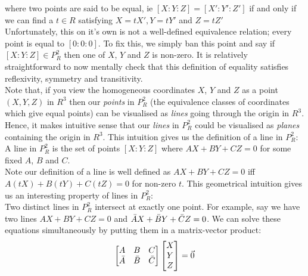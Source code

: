 \documentclass{article}
\begin{document}
where two points are said to be equal, ie $[X : Y : Z] = [X' : Y' : Z']$ if and only if we can find a $t \in R$ satisfying $X = tX', Y =  tY'$ and $Z = tZ'$\\

Unfortunately, this on it's own is not a well-defined equivalence relation; every point is equal to $[0 : 0 : 0]$. To fix this, we simply ban this point and say if  $[X : Y : Z] \in P_R^2$  then one of $X$, $Y$ and $Z$ is non-zero. It is relatively straightforward to now mentally check that this definition of equality satisfies reflexivity, symmetry and transitivity.\\

Note that, if you view the homogeneous coordinates $X$, $Y$ and $Z$ as a point $(X, Y, Z)$ in $R^3$ then our \emph{points} in $P_R^2$ (the equivalence classes of coordinates which give equal points) can be visualised as \emph{lines} going through the origin in $R^3$. Hence, it makes intuitive sense that our \emph{lines} in $P_R^2$ could be visualised as \emph{planes} containing the origin in $R^3$. This intuition gives us the definition of a line in $P_R^2$:\\

A line in $P_R^2$ is the set of points $[X : Y : Z]$ where $AX + BY + CZ = 0$ for some fixed $A$, $B$ and $C$. \\

Note our definition of a line is well defined as  $AX + BY + CZ = 0$ iff  $A(tX) + B(tY) + C(tZ) = 0$ for non-zero $t$. This geometrical intuition gives us an interesting property of lines in $P_R^2$: \\

Two distinct lines in $P_R^2$ intersect at exactly one point. For example, say we have two lines $AX + BY + CZ = 0$ and $\Bar{A}X + \bar{B}Y + \bar{C}Z = 0$. We can solve these equations simultaneously by putting them in a matrix-vector product:\\

$$ \begin{bmatrix}
A & B & C \\
\Bar{A} & \Bar{B} & \Bar{C} 
\end{bmatrix} 
\begin{bmatrix}
X \\
Y \\
Z \\
\end{bmatrix} 
= \vec{0}
$$
\end{document}
